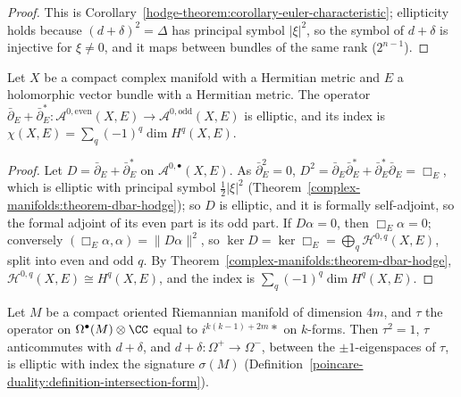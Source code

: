 \begin{proof}
This is Corollary~\ref{hodge-theorem:corollary-euler-characteristic}; ellipticity holds because $(d + \delta)^2 = \Delta$ has principal symbol $|\xi|^2$, so the symbol of $d + \delta$ is injective for $\xi \neq 0$, and it maps between bundles of
the same rank ($2^{n-1}$).
\end{proof}

\begin{proposition}\label{intersection-theory:proposition-dolbeault-operator}
Let $X$ be a compact complex manifold with a Hermitian metric and $E$ a holomorphic vector bundle with a Hermitian metric. The operator
$\bar\partial_E + \bar\partial_E^* \colon \mathcal{A}^{0,\mathrm{even}}(X, E) \to \mathcal{A}^{0,\mathrm{odd}}(X, E)$ is elliptic, and its index is $\chi(X, E) = \sum_q(-1)^q\dim H^q(X, E)$.
\end{proposition}

\begin{proof}
Let $D = \bar\partial_E + \bar\partial_E^*$ on $\mathcal{A}^{0,\bullet}(X, E)$. As $\bar\partial_E^2 = 0$, $D^2 = \bar\partial_E\bar\partial_E^* + \bar\partial_E^*\bar\partial_E = \Box_E$, which is elliptic with principal symbol $\frac12|\xi|^2$
(Theorem~\ref{complex-manifolds:theorem-dbar-hodge}); so $D$ is elliptic, and it is formally self-adjoint, so the formal adjoint of its even part is its odd part. If $D\alpha = 0$, then $\Box_E\alpha = 0$; conversely
$(\Box_E\alpha, \alpha) = \|D\alpha\|^2$, so $\ker D = \ker\Box_E = \bigoplus_q\mathcal{H}^{0,q}(X, E)$, split into even and odd $q$. By Theorem~\ref{complex-manifolds:theorem-dbar-hodge}, $\mathcal{H}^{0,q}(X, E) \cong H^q(X, E)$, and the index is
$\sum_q(-1)^q\dim H^q(X, E)$.
\end{proof}

\begin{proposition}\label{intersection-theory:proposition-signature-operator}
Let $M$ be a compact oriented Riemannian manifold of dimension $4m$, and $\tau$ the operator on $\Omega^\bullet(M) \otimes \CC$ equal to $i^{k(k-1)+2m}{*}$ on $k$-forms. Then $\tau^2 = 1$, $\tau$ anticommutes with $d + \delta$,
and $d + \delta \colon \Omega^+ \to \Omega^-$, between the $\pm1$-eigenspaces of $\tau$, is elliptic with index the signature $\sigma(M)$ (Definition~\ref{poincare-duality:definition-intersection-form}).
\end{proposition}

